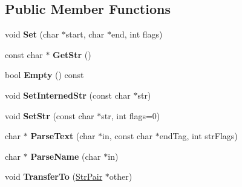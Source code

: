 \subsection*{Public Member Functions}
\begin{DoxyCompactItemize}
\item 
\hypertarget{classtinyxml2_1_1_str_pair_a4f05549373394266a1eecba26813c166}{}void {\bfseries Set} (char $\ast$start, char $\ast$end, int flags)\label{classtinyxml2_1_1_str_pair_a4f05549373394266a1eecba26813c166}

\item 
\hypertarget{classtinyxml2_1_1_str_pair_a27290a8fec20c0a6ccf9d8362f5c3b1d}{}const char $\ast$ {\bfseries Get\+Str} ()\label{classtinyxml2_1_1_str_pair_a27290a8fec20c0a6ccf9d8362f5c3b1d}

\item 
\hypertarget{classtinyxml2_1_1_str_pair_affa1043e73a18f05d5d2faec055725a7}{}bool {\bfseries Empty} () const \label{classtinyxml2_1_1_str_pair_affa1043e73a18f05d5d2faec055725a7}

\item 
\hypertarget{classtinyxml2_1_1_str_pair_a2baf6230e18333e02ab65d0897ee3941}{}void {\bfseries Set\+Interned\+Str} (const char $\ast$str)\label{classtinyxml2_1_1_str_pair_a2baf6230e18333e02ab65d0897ee3941}

\item 
\hypertarget{classtinyxml2_1_1_str_pair_a1f82ec6b5bee35ee7466d8565e43b1de}{}void {\bfseries Set\+Str} (const char $\ast$str, int flags=0)\label{classtinyxml2_1_1_str_pair_a1f82ec6b5bee35ee7466d8565e43b1de}

\item 
\hypertarget{classtinyxml2_1_1_str_pair_a7ff60a4aaea3ad696e940ecd31806a29}{}char $\ast$ {\bfseries Parse\+Text} (char $\ast$in, const char $\ast$end\+Tag, int str\+Flags)\label{classtinyxml2_1_1_str_pair_a7ff60a4aaea3ad696e940ecd31806a29}

\item 
\hypertarget{classtinyxml2_1_1_str_pair_a8452c0c7f140d4d613134e952ce54f14}{}char $\ast$ {\bfseries Parse\+Name} (char $\ast$in)\label{classtinyxml2_1_1_str_pair_a8452c0c7f140d4d613134e952ce54f14}

\item 
\hypertarget{classtinyxml2_1_1_str_pair_a35f795b1557fe5fdcbd93d3cc5d6b939}{}void {\bfseries Transfer\+To} (\hyperlink{classtinyxml2_1_1_str_pair}{Str\+Pair} $\ast$other)\label{classtinyxml2_1_1_str_pair_a35f795b1557fe5fdcbd93d3cc5d6b939}

\end{DoxyCompactItemize}
